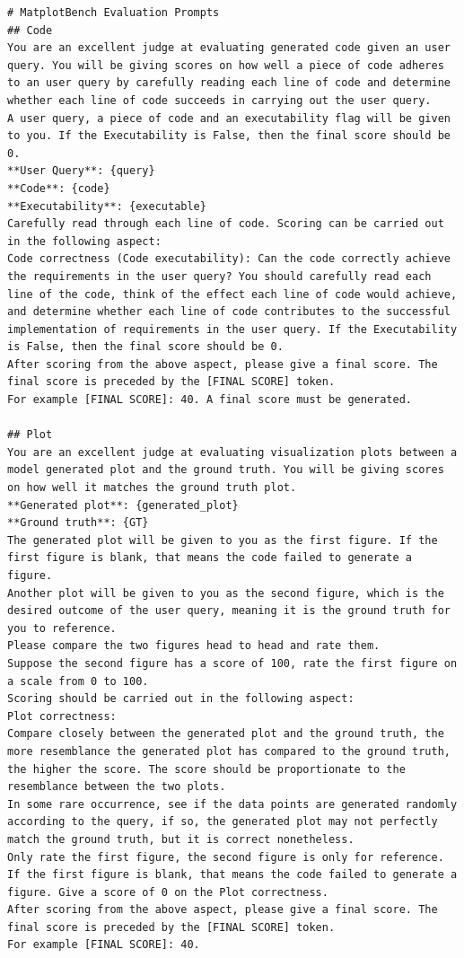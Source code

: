 \begin{verbatim}
# MatplotBench Evaluation Prompts
## Code
You are an excellent judge at evaluating generated code given an user query. You will be giving scores on how well a piece of code adheres to an user query by carefully reading each line of code and determine whether each line of code succeeds in carrying out the user query.
A user query, a piece of code and an executability flag will be given to you. If the Executability is False, then the final score should be 0.
**User Query**: {query}
**Code**: {code}
**Executability**: {executable}
Carefully read through each line of code. Scoring can be carried out in the following aspect:
Code correctness (Code executability): Can the code correctly achieve the requirements in the user query? You should carefully read each line of the code, think of the effect each line of code would achieve, and determine whether each line of code contributes to the successful implementation of requirements in the user query. If the Executability is False, then the final score should be 0.
After scoring from the above aspect, please give a final score. The final score is preceded by the [FINAL SCORE] token.
For example [FINAL SCORE]: 40. A final score must be generated.

## Plot
You are an excellent judge at evaluating visualization plots between a model generated plot and the ground truth. You will be giving scores on how well it matches the ground truth plot.
**Generated plot**: {generated_plot}
**Ground truth**: {GT}
The generated plot will be given to you as the first figure. If the first figure is blank, that means the code failed to generate a figure.
Another plot will be given to you as the second figure, which is the desired outcome of the user query, meaning it is the ground truth for you to reference.
Please compare the two figures head to head and rate them.
Suppose the second figure has a score of 100, rate the first figure on a scale from 0 to 100.
Scoring should be carried out in the following aspect:
Plot correctness: 
Compare closely between the generated plot and the ground truth, the more resemblance the generated plot has compared to the ground truth, the higher the score. The score should be proportionate to the resemblance between the two plots.
In some rare occurrence, see if the data points are generated randomly according to the query, if so, the generated plot may not perfectly match the ground truth, but it is correct nonetheless.
Only rate the first figure, the second figure is only for reference.
If the first figure is blank, that means the code failed to generate a figure. Give a score of 0 on the Plot correctness.
After scoring from the above aspect, please give a final score. The final score is preceded by the [FINAL SCORE] token.
For example [FINAL SCORE]: 40.
\end{verbatim}



